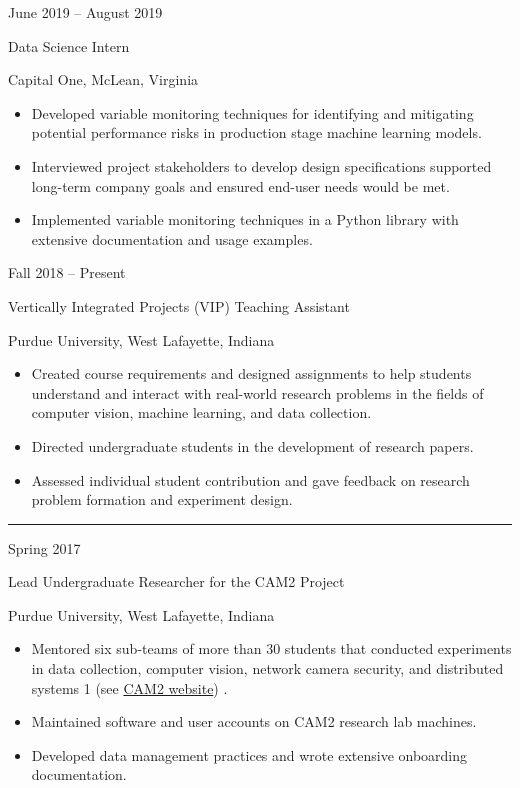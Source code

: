\documentclass[10pt]{article}
\newlength{\cvcolumngapwidth}
\newlength{\cvleftcolumnwidth}
\newlength{\cvrightcolumnwidth}
\newcommand{\cvsectionstyle}[1]{{\normalsize\cvsectionfont\textcolor{cvsectioncolor}{#1}}}
\newcommand{\cvtitlestyle}[1]{{\large\cvtitlefont\textcolor{cvtitlecolor}{#1}}}
\newcommand{\cvdurationstyle}[1]{{\small\cvdurationfont\textcolor{cvdurationcolor}{#1}}}
\newlength{\cvafteritemskipamount}
\newlength{\cvaftersectionskipamount}
\newlength{\cvparskip}
\newcommand{\cvsection}[1]{
    \begin{minipage}[t]{\cvleftcolumnwidth}
        \raggedleft\cvsectionstyle{#1}
    \end{minipage}%
    \hspace{\cvcolumngapwidth}%
    \begin{minipage}[t]{\cvrightcolumnwidth}
        \textcolor{cvrulecolor}{\rule{\cvrightcolumnwidth}{0.3mm}}
    \end{minipage}

    \vspace{\cvaftersectionskipamount}
}
\newcommand{\cvitem}[2]{
    \begin{minipage}[t]{\cvleftcolumnwidth}
        \raggedleft #1
    \end{minipage}%
    \hspace{\cvcolumngapwidth}%
    \begin{minipage}[t]{\cvrightcolumnwidth}
        \setlength{\parskip}{\cvparskip} #2
    \end{minipage}

    \vspace{\cvafteritemskipamount}
}
\newcommand{\cvtitle}[1]{
    \cvtitlestyle{#1}

    \vspace{1mm plus 0.25mm minus 0.25mm}
    \vspace{-\cvparskip}
}
\def\online{1}
\begin{document}
\cvitem{
    \cvdurationstyle{June 2019 – August 2019}
}{
    \cvtitle{Data Science Intern}

    Capital One, McLean, Virginia

    \begin{itemize}[leftmargin=*]
        \item Developed variable monitoring techniques for identifying and mitigating potential performance risks in production stage machine learning models.
        \item Interviewed project stakeholders to develop design specifications supported long-term company goals and ensured end-user needs would be met.
        \item Implemented variable monitoring techniques in a Python library with extensive documentation and usage examples.
    \end{itemize}
}

\cvitem{
    \cvdurationstyle{Fall 2018 – Present}
}{
    \cvtitle{Vertically Integrated Projects (VIP) Teaching Assistant}

    Purdue University, West Lafayette, Indiana

    \begin{itemize}[leftmargin=*]
        \item Created course requirements and designed assignments to help students understand and interact with real-world research problems in the fields of computer vision, machine learning, and data collection.
        \item Directed undergraduate students in the development of research papers.
        \item Assessed individual student contribution and gave feedback on research problem formation and experiment design.
    \end{itemize}
}

\cvsection{RESEARCH EXPERIENCE}

\cvitem{
    \cvdurationstyle{Spring 2017}
}{
    \cvtitle{Lead Undergraduate Researcher for the CAM2 Project}

    Purdue University, West Lafayette, Indiana

    \begin{itemize}[leftmargin=*]
        \item Mentored six sub-teams of more than 30 students that conducted experiments in data collection, computer vision, network camera security, and distributed systems
        \if\online1
            (see \href{https://www.cam2project.net/}{CAM2 website})
        \fi.
        \item Maintained software and user accounts on CAM2 research lab machines.
        \item Developed data management practices and wrote extensive onboarding documentation.
    \end{itemize}
}
\end{document}
